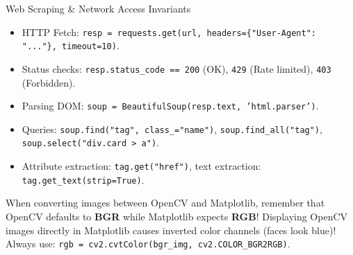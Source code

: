 \begin{formulabox}{Web Scraping \& Network Access Invariants}
\begin{itemize}[leftmargin=1.5em, itemsep=2pt]
    \item HTTP Fetch: \texttt{resp = requests.get(url, headers=\{"User-Agent": "..."\}, timeout=10)}.
    \item Status checks: \texttt{resp.status\_code == 200} (OK), \texttt{429} (Rate limited), \texttt{403} (Forbidden).
    \item Parsing DOM: \texttt{soup = BeautifulSoup(resp.text, 'html.parser')}.
    \item Queries: \texttt{soup.find("tag", class\_="name")}, \texttt{soup.find\_all("tag")}, \texttt{soup.select("div.card > a")}.
    \item Attribute extraction: \texttt{tag.get("href")}, text extraction: \texttt{tag.get\_text(strip=True)}.
\end{itemize}
\end{formulabox}

\begin{memorytip}
When converting images between OpenCV and Matplotlib, remember that OpenCV defaults to \textbf{BGR} while Matplotlib expects \textbf{RGB}! Displaying OpenCV images directly in Matplotlib causes inverted color channels (faces look blue)! Always use: \texttt{rgb = cv2.cvtColor(bgr\_img, cv2.COLOR\_BGR2RGB)}.
\end{memorytip}
